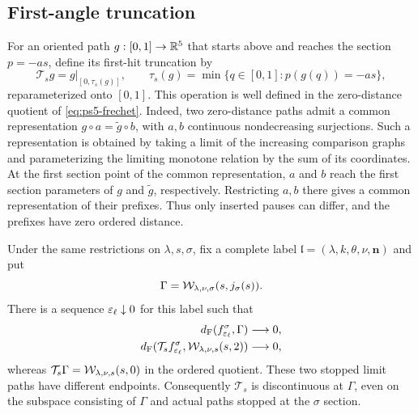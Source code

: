 \subsection{First-angle truncation}

For an oriented path $g:[0,1]\to\mathbb R^5$ that starts above and reaches
the section $p=-as$, define its first-hit truncation by
\[
 \mathcal T_s g
   =g|_{[0,\tau_s(g)]},\qquad
 \tau_s(g)=\min\{q\in[0,1]:p(g(q))=-as\},
\]
reparameterized onto $[0,1]$. This operation is well defined in the
zero-distance quotient of \eqref{eq:ps5-frechet}. Indeed, two
zero-distance paths admit a common representation
$g\circ a=\widetilde g\circ b$, with $a,b$ continuous
nondecreasing surjections. Such a representation is obtained by
taking a limit of the increasing comparison graphs and
parameterizing the limiting monotone relation by the sum of its
coordinates. At the first section
point of the common representation, $a$ and $b$ reach the first
section parameters of $g$ and $\widetilde g$, respectively.
Restricting $a,b$ there gives a common representation of their
prefixes. Thus only inserted pauses can differ, and the prefixes
have zero ordered distance.

\begin{corollary}
\label{cor:first-hit-discontinuity}
Under the same restrictions on $\lambda,s,\sigma$, fix a complete
label $\mathfrak l=(\lambda,k,\theta,\nu,\mathbf n)$ and put
\[
 \Gamma=\mathcal W_{\lambda,\nu,\sigma}(s,j_\sigma(s)).
\]
There is a sequence $\varepsilon_\ell\downarrow0$ for this label such that
\[
 \begin{split}
 d_{\mathrm F}(f_{\varepsilon_\ell}^\sigma,\Gamma)&\longrightarrow0,\\
 d_{\mathrm F}(\mathcal T_s f_{\varepsilon_\ell}^\sigma,
       \mathcal W_{\lambda,\nu,s}(s,2))&\longrightarrow0,
 \end{split}
\]
whereas
$\mathcal T_s\Gamma=\mathcal W_{\lambda,\nu,s}(s,0)$ in the ordered
quotient. These two stopped limit paths have different endpoints.
Consequently $\mathcal T_s$ is discontinuous at $\Gamma$, even on
the subspace consisting of $\Gamma$ and actual paths stopped at
the $\sigma$ section.
\end{corollary}

